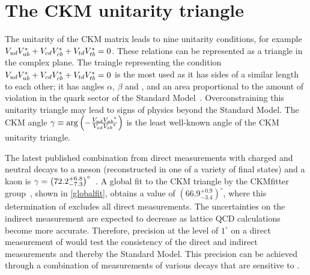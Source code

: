 \section{The CKM unitarity triangle}

The unitarity of the CKM matrix leads to nine unitarity conditions, for example ${V_{{u}{d}}}{V_{{u}{b}}^\ast} + {V_{{c}{d}}}{V_{{c}{b}}^\ast} + {V_{{t}{d}}}{V_{{t}{b}}^\ast} = 0$. These relations can be represented as a triangle in the complex plane. The traingle representing the condition ${V_{{u}{d}}}{V_{{u}{b}}^\ast} + {V_{{c}{d}}}{V_{{c}{b}}^\ast} + {V_{{t}{d}}}{V_{{t}{b}}^\ast} = 0$ is the most used as it has sides of a similar length to each other; it has angles $\alpha$, $\beta$ and \Pgamma, and an area proportional to the amount of \CP violation in the quark sector of the Standard Model~\cite{CKMtriangle}. Overconstraining this unitarity triangle may lead to signs of physics beyond the Standard Model. The CKM angle $\gamma \equiv \arg\left(-\frac{{V_{{u}{d}}}{{V_{{u}{b}}}}^*}{{V_{{c}{d}}}{{V_{{c}{b}}}}^*}\right)$ is the least well-known angle of the CKM unitarity triangle.

The latest published \lhcb combination from direct measurements with charged and neutral \B decays to a \D meson (reconstructed in one of a variety of final states) and a kaon is $\gamma = \left(72.2^{+6.8}_{-7.3}\right)^{\circ}$~\cite{LHCb-PAPER-2016-032}. A global fit to the CKM triangle by the CKMfitter group~\cite{CKMFitter}, shown in \fig\ref{globalfit}, obtains a \Pgamma value of $(66.9^{+0.9}_{-3.4})^{\circ}$, where this determination of \Pgamma excludes all direct measurements. The uncertainties on the indirect measurement are expected to decrease as lattice QCD calculations become more accurate. Therefore, precision at the level of $1^\circ$ on a direct measurement of \Pgamma would test the consistency of the direct and indirect measurements and thereby the Standard Model. This precision can be achieved through a combination of measurements of various \B decays that are sensitive to \Pgamma.


